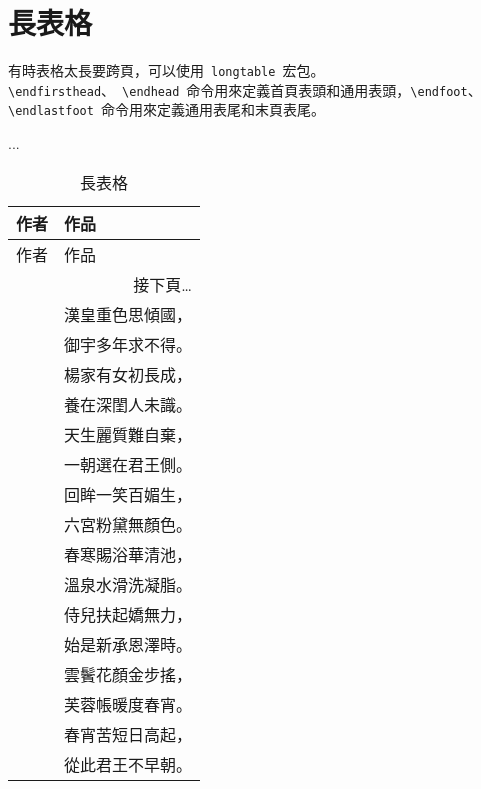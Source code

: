\section{長表格}
有時表格太長要跨頁，可以使用~\verb|longtable|~宏包\citep{Carlisle_2004}。\verb|\endfirsthead|、~\verb|\endhead|~命令用來定義首頁表頭和通用表頭，\verb|\endfoot|、\verb|\endlastfoot|~命令用來定義通用表尾和末頁表尾。
\begin{code}
\usepackage{longtable}
...
\begin{longtable}{ll}
\caption{長表格} \\
    \toprule
    作者 & 作品 \\
    \midrule
    \endfirsthead
    \midrule
    作者 & 作品 \\
    \midrule
    \endhead
    \midrule
    \multicolumn{2}{r}{接下頁\dots} \\
\end{code}
\begin{code}
    \endfoot
    \bottomrule
    \endlastfoot
    白居易 & 漢皇重色思傾國，\\
    & 御宇多年求不得。\\
    & 楊家有女初長成，\\ 
    & 養在深閨人未識。\\
    & 天生麗質難自棄，\\ 
    & 一朝選在君王側。\\
    & 回眸一笑百媚生，\\ 
    & 六宮粉黛無顏色。\\
    & 春寒賜浴華清池，\\ 
    & 溫泉水滑洗凝脂。\\
    & 侍兒扶起嬌無力，\\ 
    & 始是新承恩澤時。\\
    & 雲鬢花顏金步搖，\\ 
    & 芙蓉帳暖度春宵。\\
    & 春宵苦短日高起，\\ 
    & 從此君王不早朝。\\
\end{longtable}
\end{code}

